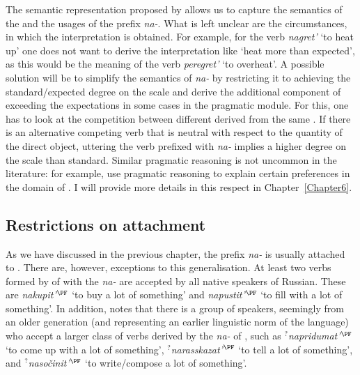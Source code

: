 The semantic representation proposed by \citet{Kagan:book} allows us to capture the semantics of the  and the  usages of the prefix \textit{na-}. What is left unclear are the circumstances, in which the  interpretation is obtained. For example, for the verb \textit{nagret'} `to heat up' one does not want to derive the interpretation like `heat more than expected', as this would be the meaning of the verb \textit{peregret'} `to overheat'. A possible solution will be to simplify the semantics of \textit{na-} by restricting it to achieving the standard/expected degree on the scale and derive the additional component of exceeding the expectations in some cases in the pragmatic module. For this, one has to look at the competition between different  derived from the same . If there is an alternative competing verb that is neutral with respect to the quantity of the direct object, uttering the verb prefixed with \textit{na-} implies a higher degree on the scale than standard. Similar pragmatic reasoning is not uncommon in the literature: for example, \citet[21]{KennedyLevin:08} use pragmatic reasoning to explain certain preferences in the domain of . I will provide more details in this respect in Chapter~\ref{Chapter6}.

\subsection{Restrictions on attachment}
As we have discussed in the previous chapter, the  prefix \textit{na-} is usually attached to . There are, however, exceptions to this generalisation. At least two verbs formed by  of  with the  \textit{na-} are accepted by all native speakers of Russian. These are \textit{nakupit'}$^{\PF}$ `to buy a lot of something' and \textit{napustit'}$^{\PF}$ `to fill with a lot of something'. In addition, \citet{Tatevosov:13a} notes that there is a group of speakers, seemingly from an older generation (and representing an earlier linguistic norm of the language) who accept a larger class of verbs derived by the \textit{na-} of , such as \textit{$^?$napridumat'}$^{\PF}$ `to come up with a lot of something', \textit{$^?$narasskazat'}$^{\PF}$ `to tell a lot of something', and \textit{$^?$naso\v{c}init'}$^{\PF}$ `to write/compose a lot of something'.

